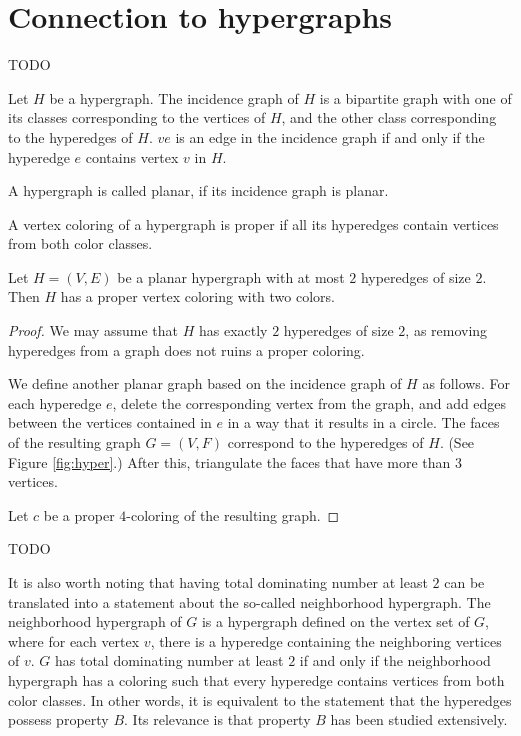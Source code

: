 \section{Connection to hypergraphs}
TODO
\begin{definition}
  Let $H$ be a hypergraph. The incidence graph of $H$ is a bipartite graph with one of
  its classes corresponding to the vertices of $H$, and the other class corresponding to
  the hyperedges of $H$. $ve$ is an edge in the incidence graph if and only if the
  hyperedge $e$ contains vertex $v$ in $H$.
\end{definition}
\begin{definition}
  A hypergraph is called planar, if its incidence graph is planar.
\end{definition}
\begin{definition}
  A vertex coloring of a hypergraph is proper if all its hyperedges contain vertices
  from both color classes.
\end{definition}

\begin{thm}
  Let $H = (V, E)$ be a planar hypergraph with at most $2$ hyperedges of size $2$. Then $H$ has
  a proper vertex coloring with two colors.
\end{thm}
\begin{proof}
  We may assume that $H$ has exactly $2$ hyperedges of size $2$, as removing hyperedges
  from a graph does not ruins a proper coloring.

  We define another planar graph based on the incidence graph of $H$ as follows.
  For each hyperedge $e$, delete the corresponding vertex from the graph, and
  add edges between the vertices contained in $e$ in a way that it results in a circle.
  The faces of the resulting graph $G=(V, F)$ correspond to the hyperedges of $H$.
  (See Figure \ref{fig:hyper}.) After this, triangulate the faces that have more than
  $3$ vertices.

  Let $c$ be a proper $4$-coloring of the resulting graph.  
\end{proof}
TODO


It is also worth noting that having total dominating number at least $2$ can be
translated into a statement about the so-called neighborhood hypergraph. The neighborhood
hypergraph of $G$ is a hypergraph defined on the vertex set of $G$, where for each vertex
$v$, there is a hyperedge containing the neighboring vertices of $v$. $G$ has total
dominating number at least $2$ if and only if the neighborhood hypergraph has a coloring
such that every hyperedge contains vertices from both color classes. In other words,
it is equivalent to the statement that the hyperedges possess property $B$. Its relevance
is that property $B$ has been studied extensively.
